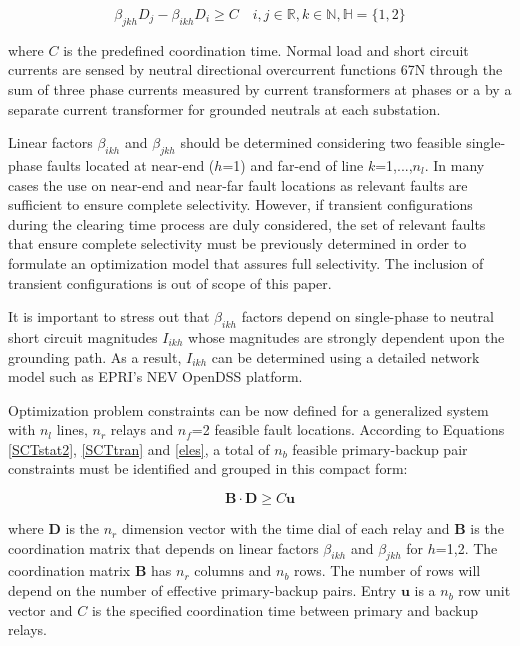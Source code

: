 \documentclass[letterpaper, 10 pt, conference]{IEEEtran}
\begin{document}
 \begin{equation} \label{SCTstat2}
  \beta_{jkh}D_{j}-\beta_{ikh}D_{i}\geq C\quad  i,j\in \mathds{R}, k\in \mathds{N}, \mathds{H}=\{1,2\}
\end{equation}

where $C$ is the predefined coordination time. Normal load and short circuit currents are sensed by neutral directional overcurrent functions 67N through the sum of three phase currents measured by current transformers at phases or a by  a separate current transformer for grounded neutrals at each substation.

Linear factors $\beta_{ikh}$ and  $\beta_{jkh}$   should be determined considering two feasible single-phase faults located at near-end ($h$=1) and far-end of line $k$=1,...,$n_l$. In many cases the use on near-end and near-far fault locations as relevant faults are sufficient to ensure complete selectivity. However, if transient configurations during the clearing time process are duly considered, the set of relevant faults that ensure complete selectivity must be previously determined in order to formulate an optimization model that assures full selectivity. The inclusion of transient configurations is out of scope of this paper.


It is important to stress out that  $\beta_{ikh}$  factors depend on single-phase to neutral short circuit magnitudes $I_{ikh}$  whose magnitudes are strongly dependent upon the grounding path. As a result, $I_{ikh}$ can be determined using a detailed network model such as EPRI's NEV OpenDSS platform.

Optimization problem constraints can be now defined for a generalized system with $n_l$ lines, $n_r$ relays and $n_f$=2 feasible fault locations. According to Equations \ref{SCTstat2}, \ref{SCTtran} and \ref{eles}, a total of $n_b$ feasible primary-backup pair constraints must be identified and grouped in this compact form:

\begin{equation}\label{BB}
 \mathbf{B}\cdot\mathbf{D}\ge C\mathbf{u}
\end{equation}

where  $\mathbf{D}$ is the $n_r$ dimension vector with the time dial of each relay and $\mathbf{B}$ is the   coordination matrix that depends on linear factors $\beta_{ikh}$  and $\beta_{jkh}$ for $h$=1,2. The coordination matrix $\mathbf{B}$ has $n_r$ columns and $n_b$ rows. The number of rows will depend on the number of effective primary-backup pairs. Entry  $\mathbf{u}$ is a $n_b$ row unit vector and $C$ is the specified coordination time between primary and backup relays.
\end{document}
